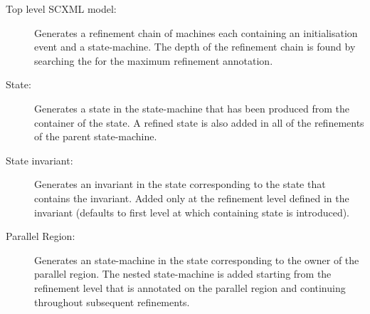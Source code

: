 \begin{description}
\item[Top level SCXML model:] 
  \begin{sloppypar}
    Generates a refinement chain of \EVENTB machines each containing
    an initialisation event and a \UMLB state-machine.  The depth of
    the refinement chain is found by searching the \SCXML for the
    maximum refinement annotation.
  \end{sloppypar}

\item[State:] Generates a state in the \UMLB state-machine that has been produced from the container of the \SCXML state. 
A refined state is also added in all of the refinements of the parent \UMLB state-machine. 

\item[State invariant:] Generates an invariant in the \UMLB state corresponding to the \SCXML state that contains the invariant. 
Added only at the refinement level defined in the invariant (defaults to first level at which containing \UMLB state is introduced). 

\item[Parallel Region:] Generates an \UMLB state-machine in the state corresponding to the owner of the parallel region. 
The nested \UMLB state-machine is added starting from the refinement level that is annotated on the parallel region and continuing throughout subsequent refinements. 



\end{description}
